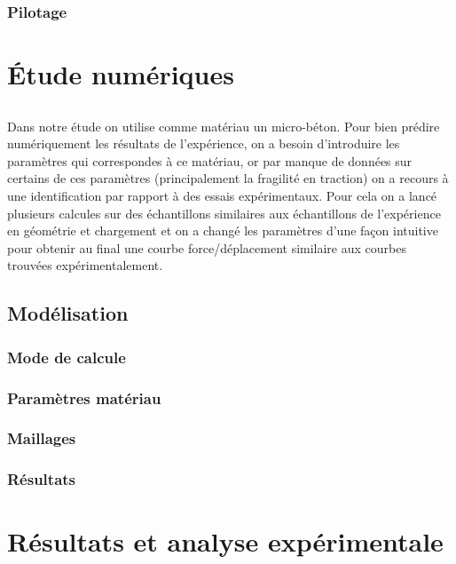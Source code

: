 \documentclass[12pt]{report}
\begin{document}
\section{Pilotage}

\part{Étude numériques}
\chapter*{}
Dans notre étude on utilise comme matériau un micro-béton. Pour bien prédire numériquement
les résultats de l'expérience, on a besoin d'introduire les paramètres qui correspondes à ce
matériau, or par manque de données sur certains de ces paramètres (principalement la fragilité en
traction) on a recours à une identification par rapport à des essais expérimentaux. Pour cela on a
lancé plusieurs calcules sur des échantillons similaires aux échantillons de l'expérience en
géométrie et chargement et on a changé les paramètres d'une façon intuitive pour obtenir au final
une courbe force/déplacement similaire aux courbes trouvées expérimentalement.

\chapter{Modélisation}
\section{Mode de calcule}


\section{Paramètres matériau}


\section{Maillages}


\section{Résultats}


\part{Résultats et analyse expérimentale}
\chapter*{}
\end{document}
